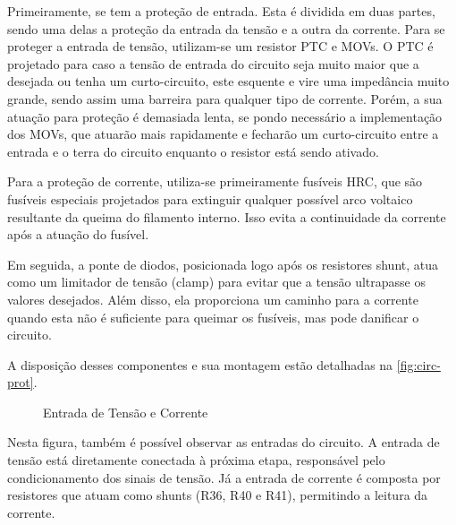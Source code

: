Primeiramente, se tem a proteção de entrada. Esta é dividida em duas partes, sendo uma delas a proteção da entrada da tensão e a outra da corrente. Para se proteger a entrada de tensão, utilizam-se um resistor \gls{PTC} e \gls{MOV}s. O \gls{PTC} é projetado para caso a tensão de entrada do circuito seja muito maior que a desejada ou tenha um curto-circuito, este esquente e vire uma impedância muito grande, sendo assim uma barreira para qualquer tipo de corrente. Porém, a sua atuação para proteção é demasiada lenta, se pondo necessário a implementação dos \gls{MOV}s, que atuarão mais rapidamente e fecharão um curto-circuito entre a entrada e o terra do circuito enquanto o resistor está sendo ativado.

Para a proteção de corrente, utiliza-se primeiramente fusíveis \gls{HRC}, que são fusíveis especiais projetados para extinguir qualquer possível arco voltaico resultante da queima do filamento interno. Isso evita a continuidade da corrente após a atuação do fusível.

Em seguida, a ponte de diodos, posicionada logo após os resistores shunt, atua como um limitador de tensão (clamp) para evitar que a tensão ultrapasse os valores desejados. Além disso, ela proporciona um caminho para a corrente quando esta não é suficiente para queimar os fusíveis, mas pode danificar o circuito.

A disposição desses componentes e sua montagem estão detalhadas na \autoref{fig:circ-prot}.

\begin{figure}[htb!]
    \caption{Entrada de Tensão e Corrente}
    \vspace*{5mm}
    \label{fig:circ-prot}
    \fonte{}
\end{figure}

Nesta figura, também é possível observar as entradas do circuito. A entrada de tensão está diretamente conectada à próxima etapa, responsável pelo condicionamento dos sinais de tensão. Já a entrada de corrente é composta por resistores que atuam como shunts (R36, R40 e R41), permitindo a leitura da corrente.

